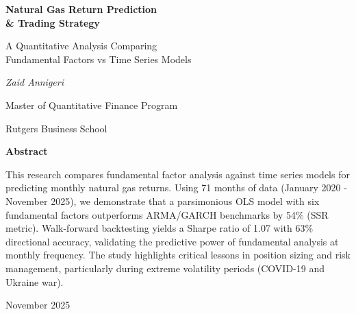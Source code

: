 \documentclass[12pt,a4paper]{article}
\begin{document}
\begin{titlepage}
    \centering
    \vspace*{2cm}

    {\Huge\bfseries Natural Gas Return Prediction \\ \& Trading Strategy\par}
    \vspace{0.5cm}
    {\Large A Quantitative Analysis Comparing \\ Fundamental Factors vs Time Series Models\par}

    \vspace{2cm}

    {\Large\itshape Zaid Annigeri\par}
    \vspace{0.5cm}
    {\large Master of Quantitative Finance Program\par}
    {\large Rutgers Business School\par}

    \vfill

    {\large \textbf{Abstract}\par}
    \vspace{0.5cm}
    \begin{minipage}{0.8\textwidth}
        \small
        This research compares fundamental factor analysis against time series models for predicting monthly natural gas returns. Using 71 months of data (January 2020 - November 2025), we demonstrate that a parsimonious OLS model with six fundamental factors outperforms ARMA/GARCH benchmarks by 54\% (SSR metric). Walk-forward backtesting yields a Sharpe ratio of 1.07 with 63\% directional accuracy, validating the predictive power of fundamental analysis at monthly frequency. The study highlights critical lessons in position sizing and risk management, particularly during extreme volatility periods (COVID-19 and Ukraine war).
    \end{minipage}

    \vfill

    {\large November 2025\par}
\end{titlepage}

\end{document}
